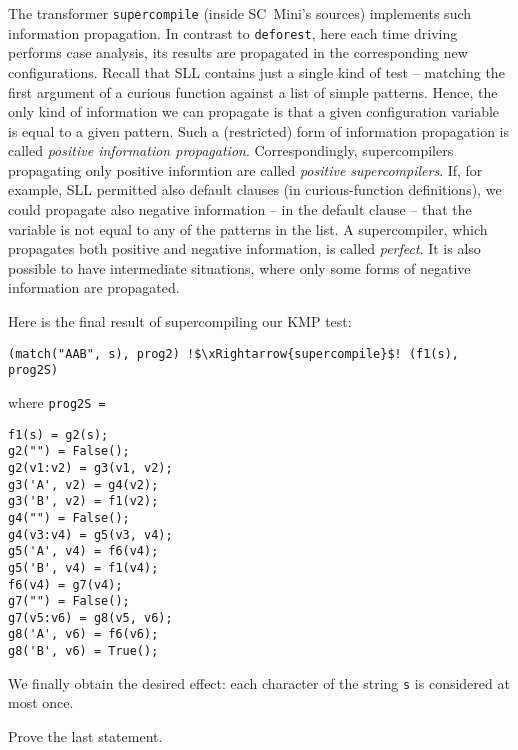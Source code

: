The transformer \texttt{supercompile} (inside SC~Mini's sources) implements such information propagation.
In contrast to \texttt{deforest}, here each time driving performs case analysis,
its results are propagated in the corresponding new configurations.
Recall that SLL contains just a single kind of test -- matching the first argument of 
a curious function against a list of simple patterns.
Hence, the only kind of information we can propagate is that
a given configuration variable is equal to a given pattern.
Such a (restricted) form of information propagation is 
called \emph{positive information propagation}.
Correspondingly, supercompilers propagating only positive informtion
are called \emph{positive supercompilers}.
If, for example, SLL permitted also default clauses
(in curious-function definitions), we could propagate 
also negative information -- in the default clause -- that
the variable is not equal to any of the patterns in the list.
A supercompiler, which propagates both positive and negative information,
is called \emph{perfect}. It is also possible to have intermediate 
situations, where only some forms of negative information are propagated.

Here is the final result of supercompiling our KMP test:
\begin{lstlisting}[language=sll,escapechar=!]
(match("AAB", s), prog2) !$\xRightarrow{supercompile}$! (f1(s), prog2S)
\end{lstlisting}
where \texttt{prog2S = }
\begin{lstlisting}[language=sll]
f1(s) = g2(s);
g2("") = False();
g2(v1:v2) = g3(v1, v2);
g3('A', v2) = g4(v2);
g3('B', v2) = f1(v2);
g4("") = False();
g4(v3:v4) = g5(v3, v4);
g5('A', v4) = f6(v4);
g5('B', v4) = f1(v4);
f6(v4) = g7(v4);
g7("") = False();
g7(v5:v6) = g8(v5, v6);
g8('A', v6) = f6(v6);
g8('B', v6) = True();
\end{lstlisting}

We finally obtain the desired effect: each character of the string \texttt{s}
is considered at most once.

\begin{exercise}
Prove the last statement.
\end{exercise}

